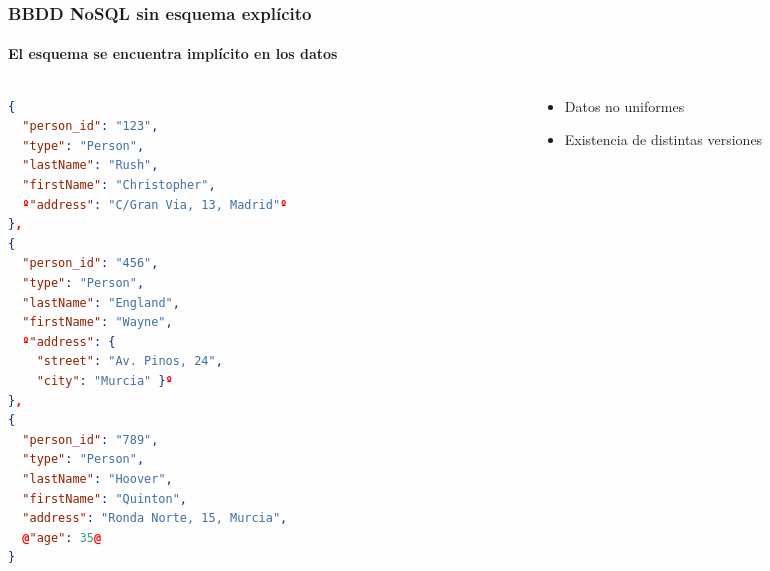 \documentclass[14pt]{beamer}
\begin{document}
\begin{frame}
\begin{itemize}
\begin{frame}
\end{frame}


\begin{frame}[fragile]
  \frametitle{BBDD NoSQL sin esquema explícito}
  \framesubtitle{El esquema se encuentra implícito en los datos}
  \begin{columns}
    \begin{column}{0.5\textwidth}
\begin{lstlisting}[language=json,basicstyle=\tiny\tt]
{
  "person_id": "123",
  "type": "Person",
  "lastName": "Rush",
  "firstName": "Christopher",
  º"address": "C/Gran Via, 13, Madrid"º
},
{
  "person_id": "456",
  "type": "Person",
  "lastName": "England",
  "firstName": "Wayne",
  º"address": {
    "street": "Av. Pinos, 24",
    "city": "Murcia" }º
},
{
  "person_id": "789",
  "type": "Person",
  "lastName": "Hoover",
  "firstName": "Quinton",
  "address": "Ronda Norte, 15, Murcia",
  @"age": 35@
}
      \end{lstlisting}
    \end{column}
    \begin{column}{0.05\textwidth}
      \begin{center}
        \usetikzlibrary{decorations.pathreplacing}
      \end{center}
    \end{column}
    \begin{column}{0.45\textwidth}
      \vspace{1cm}
      \usetikzlibrary{arrows}
      \hspace{-2cm}
\begin{small}
      \begin{itemize}
        \item Datos no uniformes
        \item Existencia de distintas versiones
      \end{itemize}
    \end{small}
  \end{column}
  \end{columns}
\end{frame}


\end{itemize}
\end{frame}
\end{document}
